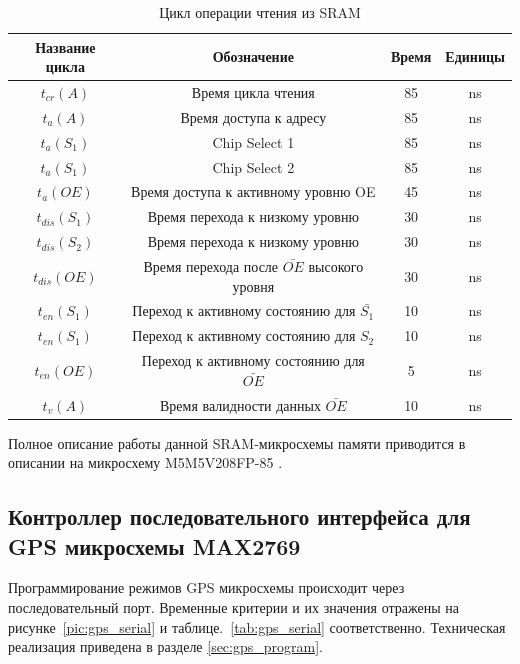 \begin{table}[H]
\begin{center}
\caption{Цикл операции чтения из SRAM}
\label{tab:sram_read_cycle}
\begin{tabular}{|c|c|c|c|}
	\hline
		Название цикла & Обозначение & Время & Единицы \\
	\hline
		${t_{cr}(A)}$ & Время цикла чтения & 85 & ns \\
	\hline
		${t_a(A)}$ & Время доступа к адресу & 85 & ns \\
	\hline
		${t_a(S_1)}$ & Chip Select 1 & 85 & ns \\
	\hline
		${t_a(S_1)}$ & Chip Select 2 & 85 & ns \\
	\hline
		${t_a(OE)}$ & Время доступа к активному уровню OE & 45 & ns \\
	\hline
		${t_{dis}(S_1)}$ & Время перехода к низкому уровню & 30 & ns \\
	\hline
		${t_{dis}(S_2)}$ & Время перехода к низкому уровню & 30 & ns \\
	\hline
		${t_{dis}(OE)}$ & Время перехода после $\bar{OE}$ высокого уровня & 30 & ns \\
	\hline
		${t_{en}(S_1)}$ & Переход к активному состоянию для $\bar{S_1}$ & 10 & ns \\
	\hline
		${t_{en}(S_1)}$ & Переход к активному состоянию для ${S_2}$ & 10 & ns \\
	\hline
		${t_{en}(OE)}$ & Переход к активному состоянию для $\bar{OE}$ & 5 & ns \\
	\hline
		${t_{v}(A)}$ & Время валидности данных $\bar{OE}$ & 10 & ns \\
	\hline
\end{tabular}
\end{center}
\end{table}

Полное описание работы данной SRAM-микросхемы памяти приводится в описании на микросхему M5M5V208FP-85 \cite{sram}.

\subsection{Контроллер последовательного интерфейса для GPS микросхемы MAX2769}
Программирование режимов GPS микросхемы происходит через последовательный порт. Временные критерии и их значения
отражены на рисунке~\ref{pic:gps_serial} и таблице.~\ref{tab:gps_serial} соответственно. Техническая реализация приведена в
разделе \ref{sec:gps_program}.

